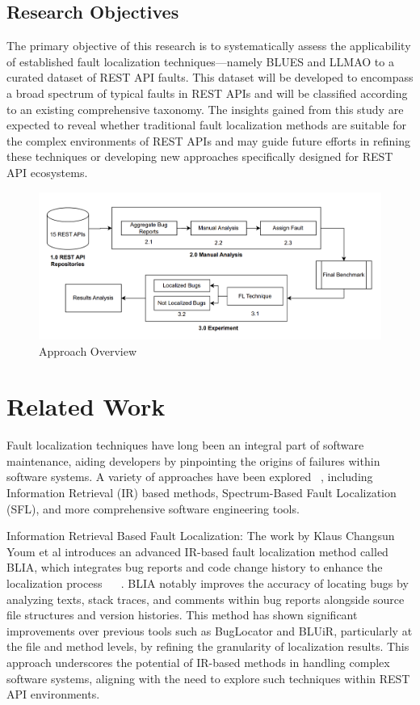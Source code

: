 \documentclass[conference]{IEEEtran}
\begin{document}
\subsection{Research Objectives}
The primary objective of this research is to systematically assess the applicability of established fault localization techniques—namely 
BLUES and LLMAO to a curated dataset of REST API faults. 
This dataset will be developed to encompass a broad spectrum of typical faults in REST APIs and will be classified according to an existing comprehensive taxonomy. 
The insights gained from this study are expected to reveal whether traditional fault localization methods are suitable for the complex environments of REST APIs and may guide future efforts in refining these techniques or developing new approaches specifically designed for REST API ecosystems.

\begin{figure}[t] 
    \centering
    \includegraphics[width=1.0\textwidth]{fig2.png}
    \caption{Approach Overview}
    \label{fig:widefigure}
  \end{figure}

\section{Related Work}
\label{sec:relatedwork}

Fault localization techniques have long been an integral part of software maintenance, aiding developers by pinpointing the origins of failures within software systems. 
A variety of approaches have been explored ~\cite{Wong2023_Software_Fault_localization}, including Information Retrieval (IR) based methods, Spectrum-Based Fault Localization (SFL), and more comprehensive software engineering tools.

Information Retrieval Based Fault Localization: The work by Klaus Changsun Youm et al introduces an advanced IR-based fault localization method called BLIA, which integrates bug reports and code change history to enhance the localization process  ~\cite{7467300} ~\cite{ctx114059874780001451}. BLIA notably improves the accuracy of locating bugs by analyzing texts, stack traces, and comments within bug reports alongside source file structures and version histories. This method has shown significant improvements over previous tools such as BugLocator and BLUiR, particularly at the file and method levels, by refining the granularity of localization results. This approach underscores the potential of IR-based methods in handling complex software systems, aligning with the need to explore such techniques within REST API environments.
\end{document}
